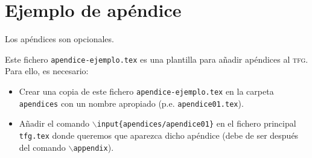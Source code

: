 
\chapter{Ejemplo de apéndice}\label{ap:apendice1}

Los apéndices son opcionales.

Este fichero \texttt{apendice-ejemplo.tex} es una plantilla para añadir apéndices al \textsc{tfg}. Para ello, es necesario:
\begin{itemize}
  \item Crear una copia de este fichero \texttt{apendice-ejemplo.tex} en la carpeta \texttt{apendices} con un nombre apropiado (p.e. \texttt{apendice01.tex}).
  \item Añadir el comando \texttt{$\backslash$input\{apendices/apendice01\}} en el fichero principal \texttt{tfg.tex} donde queremos que aparezca dicho apéndice (debe de ser después del comando \texttt{$\backslash$appendix}).
\end{itemize}

\endinput
